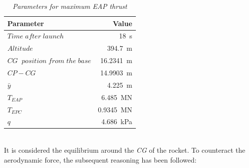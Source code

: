 \documentclass[12pt,fleqn,openany]{book} %
\begin{document}
\begin{table}[h]
	\centering
	\begin{tabular}{ l r }
\toprule
Parameter					&Value 				\\
\midrule                                                                                                             
$Time\; after\; launch$			&\SI{18}{s}			\\
$Altitude$					&\SI{394.7}{m}      \\
$CG\;\; position\; from\; the\; base$	&\SI{16.2341}{m}    \\
$CP-CG $				&\SI{14.9903}{m}    \\
$\bar{y}$ 					&\SI{4.225}{m}      \\
$T_{EAP}$						&\SI{6.485}{MN}     \\
$T_{EPC}$						&\SI{0.9345}{MN}    \\
$q$							&\SI{4.686}{kPa}    \\
\bottomrule
\end{tabular} 
\caption{\emph{Parameters for maximum EAP thrust}}        
\label{tab:maxEAPpar}                       
\end{table}\\
It is considered the equilibrium around the \textit{CG} of the rocket. To counteract the aerodynamic force, the subsequent reasoning has been followed: 
\end{document}
